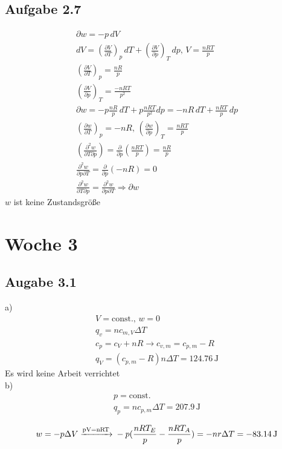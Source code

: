 \documentclass{article}
\begin{document}
\subsection*{Aufgabe 2.7}
\begin{eqnarray*}
    \partial w = -p\,dV\\
    dV = \left(\frac{\partial V}{\partial T}\right)_p\,dT + \left(\frac{\partial V}{\partial p}\right)_T\,dp,\,V=\frac{nRT}{p}\\
    \left(\frac{\partial V}{\partial T}\right)_p = \frac{nR}{p}\\
    \left(\frac{\partial V}{\partial p}\right)_T = \frac{-nRT}{p^2}\\
    \partial w = -p\frac{nR}{p}\,dT + p \frac{nRT}{p^2}dp = -nR\,dT + \frac{nRT}{p}\,dp\\
    \left(\frac{\partial w}{\partial T}\right)_p = -nR,\, \left(\frac{\partial w}{\partial p}\right)_T = \frac{nRT}{p}\\
    \left(\frac{\partial^2 w}{\partial T \partial p}\right) = \frac{\partial}{\partial p}\left(\frac{nRT}{p}\right)=\frac{nR}{p}\\
    \frac{\partial^2 w}{\partial p \partial T} = \frac{\partial}{\partial p}(-nR) = 0\\
    \frac{\partial^2 w}{\partial T \partial p} = \frac{\partial^2 w}{\partial p \partial T} \Rightarrow \partial w
\end{eqnarray*}
$w$ ist keine Zustandsgröße

\section*{Woche 3}
\subsection*{Augabe 3.1}
a)\begin{eqnarray*}
    V=\mathrm{const.},\,w=0\\
    q_v=nc_{m,V}\Delta T\\
    c_p=c_V+nR \rightarrow c_{v,m} = c_{p,m} - R\\
    q_V=(c_{p,m}-R)n\Delta T = 124.76\,\mathrm{J}
\end{eqnarray*}
Es wird keine Arbeit verrichtet\\
b)\begin{eqnarray*}
    p = \mathrm{const.}\\
    q_p=nc_{p,m}\Delta T = 207.9\,\mathrm{J}\\
\end{eqnarray*}
\begin{equation*}
    w=-p\Delta V \ce{->[{pV=nRT}]} -p(\frac{nRT_E}{p}-\frac{nRT_A}{p})=-nr\Delta T = -83.14\,\mathrm{J}
\end{equation*}
\end{document}
